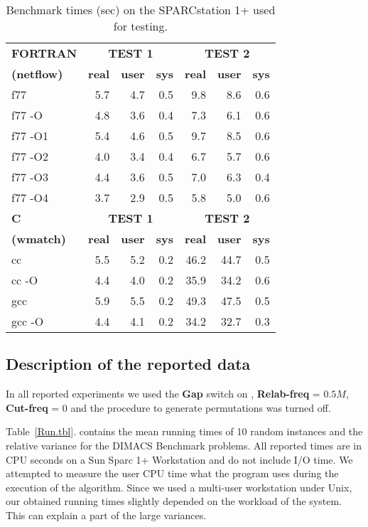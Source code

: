 \begin{table}[h]\begin{center}
\caption{Benchmark times (sec) on the SPARCstation 1+ used for
testing. \label{Bench.tbl}}  
\begin{tabular}{||l|r|r|r||r|r|r||}
\hline
{\bf FORTRAN} & \multicolumn{3}{c||}{\bf TEST 1} &
\multicolumn{3}{c||}{\bf TEST 2}\\
\cline{2-7} 
{\bf (netflow)}& {\bf real } & {\bf user} & {\bf sys } & {\bf real } & {\bf user} & {\bf sys }\\
\hline
f77 & 5.7 &   4.7 &   0.5 & 9.8 &   8.6 &   0.6 \\
f77 -O & 4.8 &   3.6 &   0.4 & 7.3 &   6.1 &   0.6 \\
f77 -O1 & 5.4 &   4.6 &   0.5 & 9.7 &   8.5 &   0.6 \\
f77 -O2 & 4.0 &   3.4 &   0.4 & 6.7 &   5.7 &   0.6 \\
f77 -O3 &  4.4 &   3.6 &   0.5 & 7.0 &   6.3 &   0.4 \\
f77 -O4 & 3.7 &   2.9 &   0.5 & 5.8 &   5.0 &   0.6 \\
\hline
\hline
{\bf C} & \multicolumn{3}{c||}{\bf TEST 1} & \multicolumn{3}{c||}{\bf
TEST 2} \\
\cline {2-7}
 {\bf(wmatch)} & {\bf real } & {\bf user} & {\bf sys } & {\bf real } & {\bf user} & {\bf sys }\\
\hline
cc &   5.5 & 5.2 & 0.2 & 46.2 &  44.7 & 0.5 \\  
cc -O &   4.4 & 4.0 & 0.2 &  35.9 &  34.2 & 0.6 \\  
gcc &   5.9 & 5.5 & 0.2 &  49.3 &  47.5 & 0.5 \\  
gcc -O &   4.4 & 4.1 & 0.2 & 34.2 &  32.7 & 0.3 \\  
\hline
\end{tabular}\end{center}
\end{table}

\subsection {Description of the reported data}

In all reported experiments we used the {\bf Gap} switch on ,
{\bf Relab-freq} = $0.5M$, {\bf Cut-freq} = 0 and the procedure to
generate permutations was turned off.

Table~\ref{Run.tbl}. contains the mean running times of 10 random
instances and the relative variance for the DIMACS Benchmark
problems. 
 All reported times are in CPU seconds on a Sun Sparc 1+ Workstation
and do not include I/O time. We attempted to measure the user CPU time
what the program uses during the execution of the algorithm.  
Since we used a multi-user workstation under Unix, our obtained
running times slightly depended on the workload of the system.
This can explain a part of the large variances.

